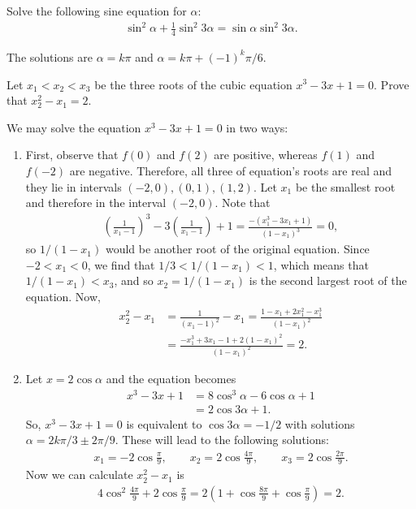 \documentclass[12pt,a4paper]{memoir}
\theoremstyle{definition}
\begin{document}
\begin{question}
	Solve the following sine equation for $\alpha$:
	\begin{align*}
		\sin^2 \alpha + \frac{1}{4}\sin^2 3\alpha = \sin\alpha \sin^2 3\alpha.
	\end{align*}
\end{question}

\begin{solution}
	The solutions are $\alpha=k\pi$ and $\alpha=k\pi+(-1)^k\pi/6$.
\end{solution}


\begin{question}
	Let $x_1<x_2<x_3$ be the three roots of the cubic equation $x^3-3x+1=0$. Prove that $x_2^2-x_1=2$.
\end{question}

\begin{solution}
	We may solve the equation $x^3-3x+1=0$ in two ways:
	\begin{enumerate}
		\item First, observe that $f(0)$ and $f(2)$ are positive, whereas $f(1)$ and $f(-2)$ are negative. Therefore, all three of equation's roots are real and they lie in intervals $(-2,0), (0,1), (1,2)$. Let $x_1$ be the smallest root and therefore in the interval $(-2,0)$. Note that
		\begin{align*}
			\left(\frac{1}{x_1-1}\right)^3 - 3\left(\frac{1}{x_1-1}\right) + 1 = \frac{-(x_1^3-3x_1+1)}{(1-x_1)^3}=0,
		\end{align*}
		so $1/(1-x_1)$ would be another root of the original equation. Since $-2< x_1 < 0$, we find that $1/3 < 1/(1-x_1) < 1$, which means that $1/(1-x_1) < x_3$, and so $x_2=1/(1-x_1)$ is the second largest root of the equation. Now,
		\begin{align*}
			x_2^2 - x_1 &= \frac{1}{(x_1-1)^2} - x_1 = \frac{1-x_1+2x_1^2-x_1^3}{(1-x_1)^2}\\
			&= \frac{-x_1^3 + 3x_1 - 1 + 2(1-x_1)^2}{(1-x_1)^2}= 2.
		\end{align*}
		\item Let $x=2\cos\alpha$ and the equation becomes
		\begin{align*}
			x^3-3x+1 &= 8\cos^3 \alpha - 6\cos \alpha + 1 \\
			&= 2\cos3\alpha + 1.
		\end{align*}
		So, $x^3-3x+1=0$ is equivalent to $\cos 3\alpha = -1/2$ with solutions $\alpha = 2k\pi/3 \pm 2\pi/9$. These will lead to the following solutions:
		\begin{align*}
			x_1 = -2\cos\frac{\pi}{9},\qquad x_2 = 2\cos\frac{4\pi}{9}, \qquad x_3=2\cos\frac{2\pi}{9}.
		\end{align*}
		Now we can calculate $x_2^2-x_1$ is
		\begin{align*}
			4\cos^2\frac{4\pi}{9} + 2\cos\frac{\pi}{9} = 2\left(1+\cos\frac{8\pi}{9}+\cos\frac{\pi}{9}\right) = 2.
		\end{align*}
	\end{enumerate}
\end{solution}
\end{document}

